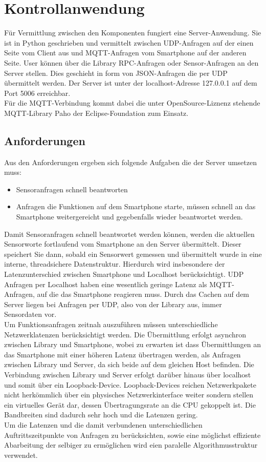 \documentclass[11pt,a4paper]{report}
\begin{document}
\chapter{Kontrollanwendung}\label{chap:server_software}

Für Vermittlung zwischen den Komponenten fungiert eine Server-Anwendung.
Sie ist in Python geschrieben und vermittelt zwischen UDP-Anfragen auf der einen Seite vom Client aus und MQTT-Anfragen vom Smartphone auf der anderen Seite.
User können über die Library RPC-Anfragen oder Sensor-Anfragen an den Server stellen.
Dies geschieht in form von JSON-Anfragen die per UDP übermittelt werden.
Der Server ist unter der localhost-Adresse 127.0.0.1 auf dem Port 5006 erreichbar.
\\
Für die MQTT-Verbindung kommt dabei die unter OpenSource-Liznenz stehende MQTT-Library Paho der Eclipse-Foundation zum Einsatz. \cite{paho}


\section{Anforderungen}
Aus den Anforderungen ergeben sich folgende Aufgaben die der Server umsetzen muss:
\begin{itemize}
\item Sensoranfragen schnell beantworten
\item Anfragen die Funktionen auf dem Smartphone starte, müssen schnell an das Smartphone weitergereicht und gegebenfalls wieder beantwortet werden.
\end{itemize}
Damit Sensoranfragen schnell beantwortet werden können, werden die aktuellen Sensorworte fortlaufend vom Smartphone an den Server übermittelt.
Dieser speichert Sie dann, sobald ein Sensorwert gemessen und übermittelt wurde in eine interne, threadsichere Datenstruktur.
Hierdurch wird insbesondere der Latenzunterschied zwischen Smartphone und Localhost berücksichtigt.
UDP Anfragen per Localhost haben eine wesentlich geringe Latenz als MQTT-Anfragen, auf die das Smartphone reagieren muss.
Durch das Cachen auf dem Server liegen bei Anfragen per UDP, also von der Library aus, immer Sensordaten vor.
\\
Um Funktionsanfragen zeitnah auszuführen müssen unterschiedliche Netzwerklatenzen berücksichtigt werden.
Die Übermittlung erfolgt asynchron zwischen Library und Smartphone, wobei zu erwarten ist dass Übermittlungen an das Smartphone mit einer höheren Latenz übertragen werden, als Anfragen zwischen Library und Server, da sich beide auf dem gleichen Host befinden.
Die Verbindung zwischen Library und Server erfolgt darüber hinaus über localhost und somit über ein Loopback-Device.
Loopback-Devices reichen Netzwerkpakete nicht herkömmlich über ein physisches Netzwerkinterface weiter sondern stellen ein virtuelles Gerät dar, dessen Übertragungsrate an die CPU gekoppelt ist.
Die Bandbreiten sind dadurch sehr hoch und die Latenzen gering.
\\
Um die Latenzen und die damit verbundenen unterschiedlichen Auftrittszeitpunkte von Anfragen zu berücksichten, sowie eine möglichst effiziente Abarbeitung der selbiger zu ermöglichen wird eien paralelle Algorithmusstruktur verwendet.
\end{document}
